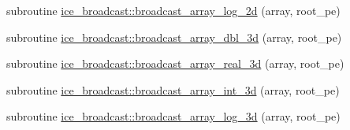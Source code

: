 \begin{DoxyCompactItemize}
\item 
subroutine \hyperlink{namespaceice__broadcast_adb50d2bd8cebc4b5529e8120f903b119}{ice\_\-broadcast::broadcast\_\-array\_\-log\_\-2d} (array, root\_\-pe)
\item 
subroutine \hyperlink{namespaceice__broadcast_ab80a5a2d64cdf81863b36b8cd172e6d8}{ice\_\-broadcast::broadcast\_\-array\_\-dbl\_\-3d} (array, root\_\-pe)
\item 
subroutine \hyperlink{namespaceice__broadcast_ae4afcd48d77d13d0acf16f33a390d4c6}{ice\_\-broadcast::broadcast\_\-array\_\-real\_\-3d} (array, root\_\-pe)
\item 
subroutine \hyperlink{namespaceice__broadcast_a54da6a1350f99173ecc9afbdad4230b0}{ice\_\-broadcast::broadcast\_\-array\_\-int\_\-3d} (array, root\_\-pe)
\item 
subroutine \hyperlink{namespaceice__broadcast_a7b9a7cb04f157e736b41e8f0fb4f595a}{ice\_\-broadcast::broadcast\_\-array\_\-log\_\-3d} (array, root\_\-pe)
\end{DoxyCompactItemize}
